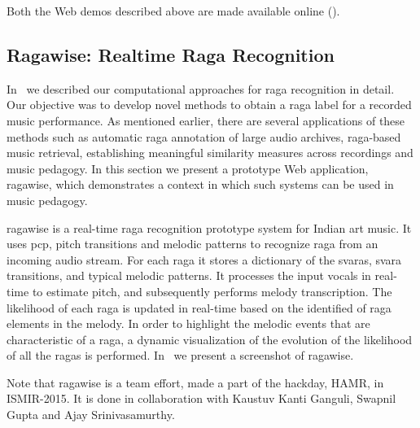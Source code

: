 Both the Web demos described above are made available online (). 


\subsection*{Ragawise: Realtime Raga Recognition}
\label{sec:ragawise}

In~\chapref{} we described our computational approaches for \gls{raga} recognition in detail. Our objective was to develop novel methods to obtain a \gls{raga} label for a recorded music performance. As mentioned earlier, there are several applications of these methods such as automatic \gls{raga} annotation of large audio archives, \gls{raga}-based music retrieval, establishing meaningful similarity measures across recordings and music pedagogy. In this section we present a prototype Web application, \gls{ragawise}, which demonstrates a context in which such systems can be used in music pedagogy. 

\gls{ragawise} is a real-time \gls{raga} recognition prototype system for Indian art music. It uses \gls{pcp}, pitch transitions and melodic patterns to recognize \gls{raga} from an incoming audio stream. For each \gls{raga} it stores a dictionary of the \glspl{svara}, \gls{svara} transitions, and typical melodic patterns. It processes the input vocals in real-time to estimate pitch, and subsequently performs melody transcription. The likelihood of each \gls{raga} is updated in real-time based on the identified of \gls{raga} elements in the melody. In order to highlight the melodic events that are characteristic of a \gls{raga}, a dynamic visualization of the evolution of the likelihood of all the \glspl{raga} is performed. In~\figref{} we present a screenshot of \gls{ragawise}. 

Note that \gls{ragawise} is a team effort, made a part of the hackday, HAMR, in ISMIR-2015. It is done in collaboration with Kaustuv Kanti Ganguli, Swapnil Gupta and Ajay Srinivasamurthy. 


